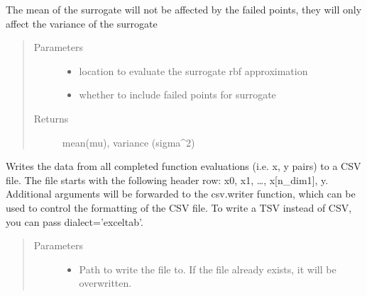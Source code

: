 \documentclass[letterpaper,12pt,english]{sphinxmanual}
\begin{document}
\begin{fulllineitems}
\begin{fulllineitems}
\sphinxAtStartPar
The mean of the surrogate will not be affected by the failed points, they will only affect
the variance of the surrogate
\begin{quote}\begin{description}
\item[{Parameters}] \leavevmode\begin{itemize}
\item {} 
\sphinxAtStartPar
{} \textendash{} location to evaluate the surrogate rbf approximation

\item {} 
\sphinxAtStartPar
{} \textendash{} whether to include failed points for surrogate

\end{itemize}

\item[{Returns}] \leavevmode
\sphinxAtStartPar
mean(mu), variance (sigma\textasciicircum{}2)

\end{description}\end{quote}

\end{fulllineitems}


\begin{fulllineitems}
\label{\detokenize{PARyOpt:PARyOpt.paryopt.BayesOpt.export_csv}}
\sphinxAtStartPar
Writes the data from all completed function evaluations (i.e. x, y pairs) to a CSV file.
The file starts with the following header row: x0, x1, …, x{[}n\_dim\sphinxhyphen{}1{]}, y.
Additional arguments will be forwarded to the csv.writer function, which can be used to control the
formatting of the CSV file. To write a TSV instead of CSV, you can pass dialect=’excel\sphinxhyphen{}tab’.
\begin{quote}\begin{description}
\item[{Parameters}] \leavevmode\begin{itemize}
\item {} 
\sphinxAtStartPar
{} \textendash{} Path to write the file to. If the file already exists, it will be overwritten.


\end{itemize}
\end{description}
\end{quote}
\end{fulllineitems}
\end{fulllineitems}
\end{document}

